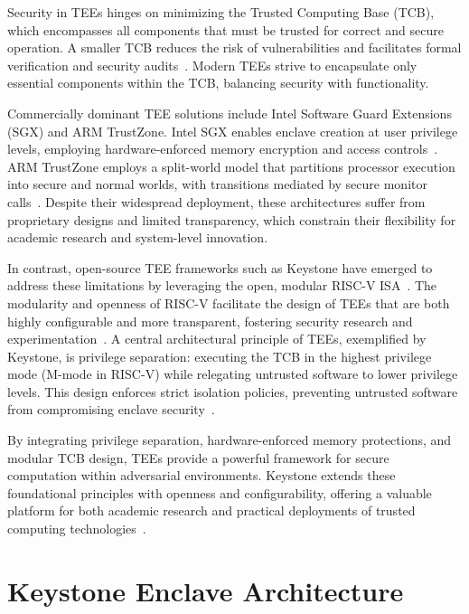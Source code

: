 Security in TEEs hinges on minimizing the Trusted Computing Base (TCB), which encompasses all components that must be trusted for correct and secure operation. A smaller TCB reduces the risk of vulnerabilities and facilitates formal verification and security audits~\cite{lee2019keystone,Survey2023}. Modern TEEs strive to encapsulate only essential components within the TCB, balancing security with functionality.

Commercially dominant TEE solutions include Intel Software Guard Extensions (SGX) and ARM TrustZone. Intel SGX enables enclave creation at user privilege levels, employing hardware-enforced memory encryption and access controls~\cite{costan2016intel}. ARM TrustZone employs a split-world model that partitions processor execution into secure and normal worlds, with transitions mediated by secure monitor calls~\cite{yan2018trustzone}. Despite their widespread deployment, these architectures suffer from proprietary designs and limited transparency, which constrain their flexibility for academic research and system-level innovation.

In contrast, open-source TEE frameworks such as Keystone have emerged to address these limitations by leveraging the open, modular RISC-V ISA~\cite{lee2019keystone,dayeol2019keystone}. The modularity and openness of RISC-V facilitate the design of TEEs that are both highly configurable and more transparent, fostering security research and experimentation~\cite{Survey2023}. A central architectural principle of TEEs, exemplified by Keystone, is privilege separation: executing the TCB in the highest privilege mode (M-mode in RISC-V) while relegating untrusted software to lower privilege levels. This design enforces strict isolation policies, preventing untrusted software from compromising enclave security~\cite{lee2019keystone}.

By integrating privilege separation, hardware-enforced memory protections, and modular TCB design, TEEs provide a powerful framework for secure computation within adversarial environments. Keystone extends these foundational principles with openness and configurability, offering a valuable platform for both academic research and practical deployments of trusted computing technologies~\cite{suzaki2021tsperf}.


\section{Keystone Enclave Architecture}

